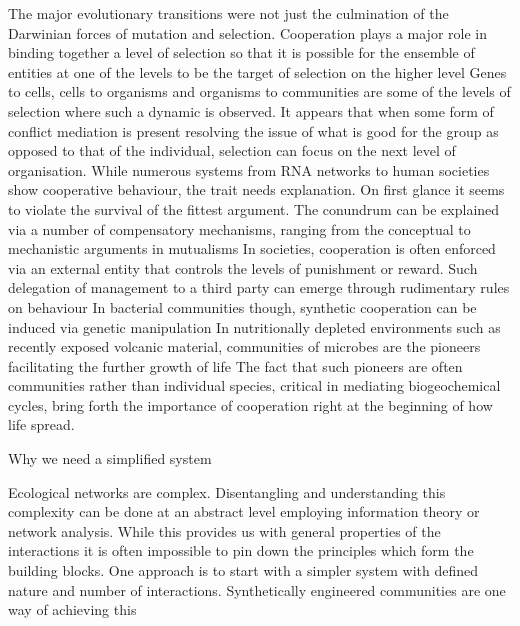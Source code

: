 The major evolutionary transitions were not just the culmination of the Darwinian forces of mutation and selection. 
Cooperation plays a major role in binding together a level of selection so that it is possible for the ensemble of entities at one of the levels to be the target of selection on the higher level %
Genes to cells, cells to organisms and organisms to communities are some of the levels of selection where such a dynamic is observed.
It appears that when some form of conflict mediation is present resolving the issue of what is good for the group as opposed to that of the individual, selection can focus on the next level of organisation.
While numerous systems from RNA networks to human societies show cooperative behaviour, the trait needs explanation.
On first glance it seems to violate the survival of the fittest argument.
The conundrum can be explained via a number of compensatory mechanisms, ranging from the conceptual %
to mechanistic arguments in mutualisms %
In societies, cooperation is often enforced via an external entity that controls the levels of punishment or reward. 
Such delegation of management to a third party can emerge through rudimentary rules on behaviour %
In bacterial communities though, synthetic cooperation can be induced via genetic manipulation %
In nutritionally depleted environments such as recently exposed volcanic material, communities of microbes are the pioneers facilitating the further growth of life %
The fact that such pioneers are often communities rather than individual species,  critical in mediating biogeochemical cycles, bring forth the importance of cooperation right at the beginning of how life spread.

Why we need a simplified system

Ecological networks are complex.
Disentangling and understanding this complexity can be done at an abstract level employing information theory or network analysis.
While this provides us with general properties of the interactions it is often impossible to pin down the principles which form the building blocks.
One approach is to start with a simpler system with defined nature and number of interactions.
Synthetically engineered communities are one way of achieving this %